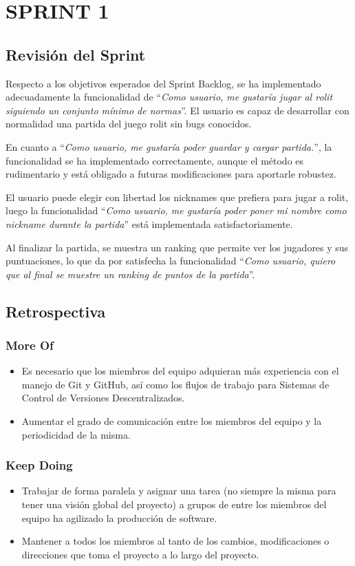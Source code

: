 \documentclass[../../SCRUM.tex]{subfiles}
\begin{document}
\section{SPRINT 1}
\subsection{Revisión del Sprint}
Respecto a los objetivos esperados del Sprint Backlog, se ha implementado adecuadamente la funcionalidad de ``\textit{Como usuario, me gustaría jugar al rolit siguiendo un conjunto mínimo de normas}''. El usuario es capaz de desarrollar con normalidad una partida del juego rolit sin bugs  conocidos.

En cuanto a ``\textit{Como usuario, me gustaría poder guardar y cargar partida.}'', la funcionalidad se ha implementado correctamente, aunque el método es rudimentario y está obligado a futuras modificaciones para aportarle robustez.

El usuario puede elegir con libertad los nicknames que prefiera para jugar a rolit, luego la funcionalidad ``\textit{Como usuario, me gustaría poder poner mi nombre como nickname durante la partida}'' está implementada satisfactoriamente.

Al finalizar la partida, se muestra un ranking que permite ver los jugadores y sus puntuaciones, lo que da por satisfecha la funcionalidad ``\textit{Como usuario, quiero que al final se muestre un ranking de puntos de la partida}''.

\subsection{Retrospectiva}
\subsubsection*{More Of}
\begin{itemize}
\item Es necesario que los miembros del equipo adquieran más experiencia con el manejo de Git y GitHub, así como los flujos de trabajo para Sistemas de Control de Versiones Descentralizados.

\item Aumentar el grado de comunicación entre los miembros del equipo y la periodicidad de la misma.

\end{itemize}
\subsubsection*{Keep Doing}
\begin{itemize}
\item Trabajar de forma paralela y asignar una tarea (no siempre la misma para tener una visión global del proyecto) a grupos de entre los miembros del equipo ha agilizado la producción de software.

\item Mantener a todos los miembros al tanto de los cambios, modificaciones o direcciones que toma el proyecto a lo largo del proyecto.
\end{itemize}
\end{document}
